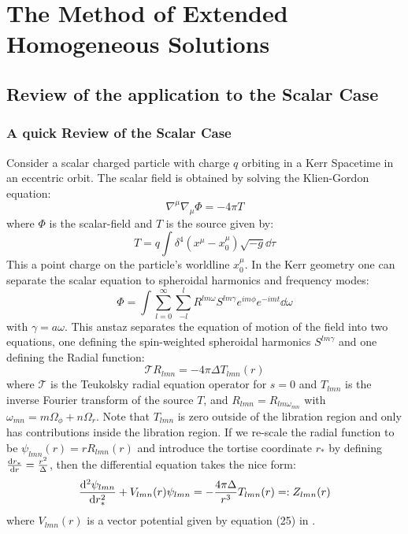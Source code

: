\documentclass[preprint,showpacs,preprintnumbers,amssymb,superscriptaddress,aps,prd,nofootinbib,11pt]{revtex4-1}
\begin{document}
\section{The Method of Extended Homogeneous Solutions}
\subsection{Review of the application to the Scalar Case \cite{Warburton_2011}}
\subsubsection{A quick Review of the Scalar Case}
Consider a scalar charged particle with charge $q$ orbiting in a Kerr Spacetime in an eccentric orbit. The scalar field is obtained by solving the Klien-Gordon equation:
\begin{equation}
    \nabla^\mu \nabla_\mu \Phi = - 4\pi T
\end{equation}
where $\Phi$ is the scalar-field and $T$ is the source given by:
\begin{equation}
    T = q \int \delta^4(x^\mu - x_0^\mu) \sqrt{-g} \dd \tau
\end{equation}
This a point charge on the particle's worldline $x_0^\mu$. In the Kerr geometry one can separate the scalar equation to spheroidal harmonics and frequency modes:
\begin{equation}
    \Phi = \int \sum\limits_{l=0}^\infty \sum \limits_{-l}^{l} R^{lm\omega} S^{lm\gamma} e^{im\phi} e^{-imt} \dd \omega
\end{equation}
with $\gamma = a \omega$. This anstaz separates the equation of motion of the field into two equations, one defining the spin-weighted spheroidal harmonics $S^{lm\gamma}$ and one defining the Radial function:
\begin{equation}
    \mathcal{T} R_{lmn} = -4\pi \Delta T_{lmn}(r)
\end{equation}
where $\mathcal{T}$ is the Teukolsky radial equation operator for $s=0$ and $T_{lmn}$ is the inverse Fourier transform of the source $T$, and $R_{lmn} = R_{lm \omega_{mn}}$ with $\omega_{mn} = m \Omega_\phi + n \Omega_r$. Note that $T_{lmn}$ is zero outside of the libration region and only has contributions inside the libration region. If we re-scale the radial function to be $\psi_{lmn} (r) = r R_{lmn}(r)$ and introduce the tortise coordinate $r_*$ by defining $\dv{r_*}{r} = \frac{r^2}{\Delta}$, then the differential equation takes the nice form:
 \begin{equation}
     \dv[2]{\psi_{lmn}}{r_*}  + V_{lmn} (r)\psi_{lmn} = -\frac{4\pi \Delta}{r^3} T_{lmn}(r) =: Z_{lmn}(r)
 \end{equation}
 where $V_{lmn}(r)$ is a vector potential given by equation (25) in \cite{Warburton_2011}. 



\end{document}
